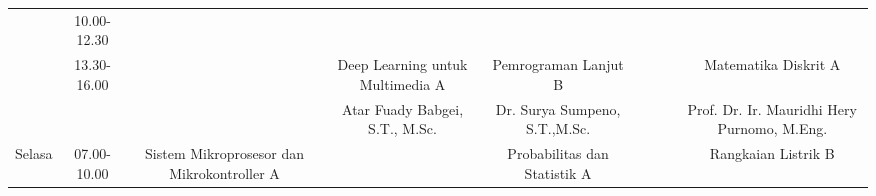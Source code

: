 \begin{table}[]
\begin{tabular}{|c|c|ccccccc|}
                          & \multirow{2}{*}{10.00-12.30} & \multicolumn{1}{c|}{}                                             & \multicolumn{1}{c|}{}                                              & \multicolumn{1}{c|}{}                                         & \multicolumn{1}{c|}{}                                                & \multicolumn{1}{c|}{}                                             & \multicolumn{1}{c|}{}                                              &                                                 \\ \cline{3-9} 
                          &                              & \multicolumn{1}{c|}{}                                             & \multicolumn{1}{c|}{}                                              & \multicolumn{1}{c|}{}                                         & \multicolumn{1}{c|}{}                                                & \multicolumn{1}{c|}{}                                             & \multicolumn{1}{c|}{}                                              &                                                 \\ \cline{2-9} 
                          & \multirow{2}{*}{13.30-16.00} & \multicolumn{1}{c|}{}                                             & \multicolumn{1}{c|}{Deep Learning untuk   Multimedia A}            & \multicolumn{1}{c|}{Pemrograman Lanjut B}                     & \multicolumn{1}{c|}{}                                                & \multicolumn{1}{c|}{}                                             & \multicolumn{1}{c|}{}                                              & Matematika Diskrit A                            \\ \cline{3-9} 
                          &                              & \multicolumn{1}{c|}{}                                             & \multicolumn{1}{c|}{Atar Fuady Babgei,   S.T., M.Sc.}              & \multicolumn{1}{c|}{Dr. Surya Sumpeno,   S.T.,M.Sc.}          & \multicolumn{1}{c|}{}                                                & \multicolumn{1}{c|}{}                                             & \multicolumn{1}{c|}{}                                              & Prof. Dr. Ir.   Mauridhi Hery Purnomo, M.Eng.   \\ \hline
  \multirow{6}{*}{Selasa} & \multirow{2}{*}{07.00-10.00} & \multicolumn{1}{c|}{Sistem Mikroprosesor   dan Mikrokontroller A} & \multicolumn{1}{c|}{}                                              & \multicolumn{1}{c|}{Probabilitas dan   Statistik A}           & \multicolumn{1}{c|}{}                                                & \multicolumn{1}{c|}{}                                             & \multicolumn{1}{c|}{}                                              & Rangkaian Listrik B                             \\ \cline{3-9} 

\end{tabular}
\end{table}
